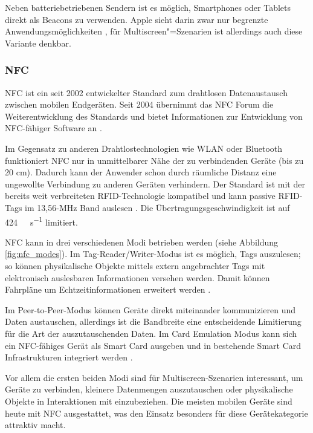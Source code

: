 Neben batteriebetriebenen Sendern ist es möglich, \zb Smartphones oder Tablets direkt als Beacons zu verwenden. Apple sieht darin zwar nur begrenzte Anwendungsmöglichkeiten \citep{iBeacon}, für Multiscreen"=Szenarien ist allerdings auch diese Variante denkbar.

\subsubsection{NFC}
\label{subsec:nfc}
\ac{NFC} ist ein seit 2002 entwickelter Standard zum drahtlosen Datenaustausch zwischen mobilen Endgeräten. Seit 2004 übernimmt das NFC Forum die Weiterentwicklung des Standards und bietet Informationen zur Entwicklung von NFC-fähiger Software an \citep{NFCAbout}. 

Im Gegensatz zu anderen Drahtlostechnologien wie WLAN oder Bluetooth funktioniert NFC nur in unmittelbarer Nähe der zu verbindenden Geräte (bis zu 20 cm). Dadurch kann der Anwender schon durch räumliche Distanz eine ungewollte Verbindung zu anderen Geräten verhindern. Der Standard ist mit der bereits weit verbreiteten \acs{RFID}-Technologie kompatibel und kann passive RFID-Tags im 13,56-MHz Band auslesen \citep[30]{Want2006}. Die Übertragungsgeschwindigkeit ist auf \SI{424}{\kilo\Bit\per\second} limitiert. 

NFC kann in drei verschiedenen Modi betrieben werden (siehe Abbildung \ref{fig:nfc_modes}). Im Tag-Reader/Writer-Modus ist es möglich, Tags auszulesen; so können physikalische Objekte mittels extern angebrachter Tags mit elektronisch auslesbaren Informationen versehen werden. Damit können \zb Fahrpläne um Echtzeitinformationen erweitert werden \citep{NFCWhat}.

Im Peer-to-Peer-Modus können Geräte direkt miteinander kommunizieren und Daten austauschen, allerdings ist die Bandbreite eine entscheidende Limitierung für die Art der auszutauschenden Daten. Im Card Emulation Modus kann sich ein NFC-fähiges Gerät als Smart Card ausgeben und in bestehende Smart Card Infrastrukturen integriert werden \citep{NFCWhat}. 

Vor allem die ersten beiden Modi sind für Multiscreen-Szenarien interessant, um Geräte zu verbinden, kleinere Datenmengen auszutauschen oder physikalische Objekte in Interaktionen mit einzubeziehen. Die meisten mobilen Geräte sind heute mit NFC ausgestattet, was den Einsatz besonders für diese Gerätekategorie attraktiv macht.

